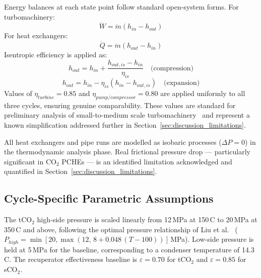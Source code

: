 Energy balances at each state point follow standard open-system forms. For
turbomachinery:
\begin{equation}
\dot{W} = \dot{m}(h_{in} - h_{out})
\label{eq:turbomachinery}
\end{equation}
For heat exchangers:
\begin{equation}
\dot{Q} = \dot{m}(h_{out} - h_{in})
\label{eq:hx}
\end{equation}
Isentropic efficiency is applied as:
\begin{equation}
h_{out} = h_{in} + \frac{h_{out,is} - h_{in}}{\eta_{is}}
\quad\text{(compression)}
\label{eq:compression}
\end{equation}
\begin{equation}
h_{out} = h_{in} - \eta_{is}(h_{in} - h_{out,is})
\quad\text{(expansion)}
\label{eq:expansion}
\end{equation}
Values of $\eta_{turbine} = 0.85$ and $\eta_{pump/compressor} = 0.80$ are
applied uniformly to all three cycles, ensuring genuine comparability. These
values are standard for preliminary analysis of small-to-medium scale
turbomachinery~\cite{Macchi2017} and represent a known simplification
addressed further in Section~\ref{sec:discussion_limitations}.

All heat exchangers and pipe runs are modelled as isobaric processes
($\Delta P = 0$) in the thermodynamic analysis phase. Real frictional pressure
drop --- particularly significant in CO$_2$ PCHEs --- is an identified
limitation acknowledged and quantified in Section~\ref{sec:discussion_limitations}.

\subsection{Cycle-Specific Parametric Assumptions}

The tCO$_2$ high-side pressure is scaled linearly from 12\,MPa at
150\,\textdegree C to 20\,MPa at 350\,\textdegree C and above, following
the optimal pressure relationship of Liu et al.~\cite{Liu2024}
($P_{high} = \min[20, \max(12,\, 8 + 0.048\,(T-100))]$\,MPa). Low-side
pressure is held at 5\,MPa for the baseline, corresponding to a condenser
temperature of 14.3\,\textdegree C. The recuperator effectiveness baseline is
$\varepsilon = 0.70$ for tCO$_2$ and $\varepsilon = 0.85$ for sCO$_2$.

